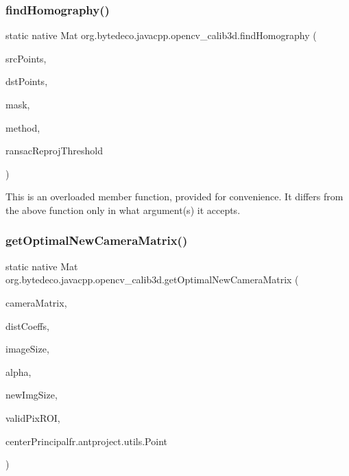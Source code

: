 \subsubsection{\texorpdfstring{find\+Homography()}{findHomography()}\hspace{0.1cm}{\footnotesize\ttfamily [2/2]}}
{\footnotesize\ttfamily static native Mat org.\+bytedeco.\+javacpp.\+opencv\+\_\+calib3d.\+find\+Homography (\begin{DoxyParamCaption}\item[{@By\+Val Mat}]{src\+Points,  }\item[{@By\+Val Mat}]{dst\+Points,  }\item[{@By\+Val Mat}]{mask,  }\item[{int}]{method,  }\item[{double}]{ransac\+Reproj\+Threshold }\end{DoxyParamCaption})\hspace{0.3cm}{\ttfamily [static]}}

This is an overloaded member function, provided for convenience. It differs from the above function only in what argument(s) it accepts. \mbox{\label{group__calib3d_ga70615047cb056a5e3787ce151ddef307}} 
\subsubsection{\texorpdfstring{get\+Optimal\+New\+Camera\+Matrix()}{getOptimalNewCameraMatrix()}}
{\footnotesize\ttfamily static native Mat org.\+bytedeco.\+javacpp.\+opencv\+\_\+calib3d.\+get\+Optimal\+New\+Camera\+Matrix (\begin{DoxyParamCaption}\item[{@By\+Val Mat}]{camera\+Matrix,  }\item[{@By\+Val Mat}]{dist\+Coeffs,  }\item[{@By\+Val Size}]{image\+Size,  }\item[{double}]{alpha,  }\item[{@By\+Val(null\+Value=\char`\"{}cv\+::\+Size()\char`\"{}) Size}]{new\+Img\+Size,  }\item[{Rect}]{valid\+Pix\+R\+OI,  }\item[{@Cast(\char`\"{}bool\char`\"{}) boolean}]{center\+Principal\+fr.antproject.utils.Point }\end{DoxyParamCaption})\hspace{0.3cm}{\ttfamily [static]}}



